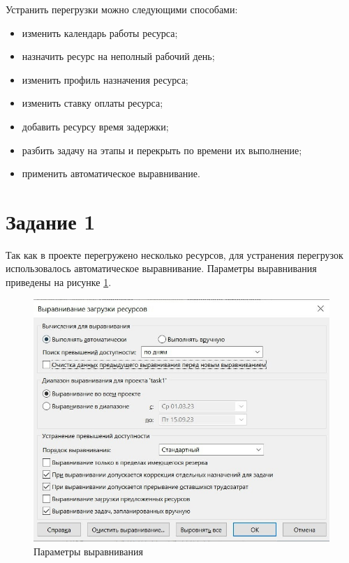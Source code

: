 Устранить перегрузки можно следующими способами:

\begin{itemize}
	\item изменить календарь работы ресурса;
	\item назначить ресурс на неполный рабочий день;
	\item изменить профиль назначения ресурса;
	\item изменить ставку оплаты ресурса;
	\item добавить ресурсу время задержки;
	\item разбить задачу на этапы и перекрыть по времени их выполнение;
	\item применить автоматическое выравнивание.
\end{itemize}

\section*{Задание 1}

Так как в проекте перегружено несколько ресурсов, для устранения перегрузок использовалось автоматическое выравнивание. Параметры выравнивания приведены на рисунке \ref{img:task1-alignment}.

\begin{figure}[H]
	\begin{center}
		\includegraphics[scale=0.45]{inc/img/task1-alignment.jpg}
	\end{center}
	\captionsetup{justification=centering}
	\caption{Параметры выравнивания}
	\label{img:task1-alignment}
\end{figure}

